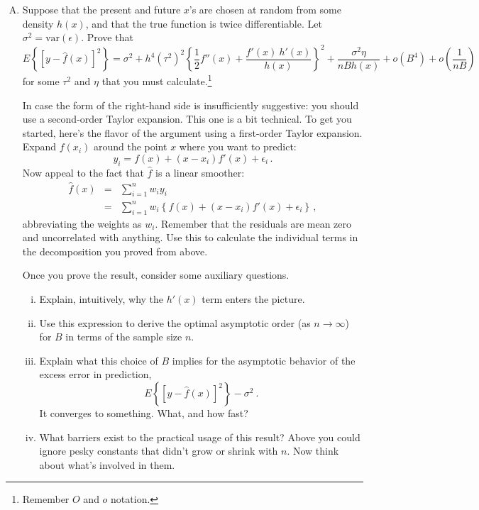 \documentclass{mynotes}
\begin{document}
\begin{enumerate}[(A)]
\item Suppose that the present and future $x$'s are chosen at random from some density $h(x)$, and that the true function is twice differentiable.  Let $\sigma^2 = \mbox{var}(\epsilon)$.  Prove that
$$
E \left\{ \left[ y - \hat{f}(x) \right]^2 \right\} = \sigma^2 
  + h^4 (\tau^2)^2 \left\{ \frac{1}{2}  f''(x) + \frac{f'(x) \ h'(x)}{ h(x) } \right\}^2 + \frac{\sigma^2 \eta}{n B h(x)} + o(B^4) + o\left( \frac{1}{nB} \right)
$$
for some $\tau^2$ and $\eta$ that you must calculate.\footnote{Remember $O$ and $o$ notation.}

In case the form of the right-hand side is insufficiently suggestive: you should use a second-order Taylor expansion.  This one is a bit technical.  To get you started, here's the flavor of the argument using a first-order Taylor expansion.  Expand $f(x_i)$ around the point $x$ where you want to predict:
$$
y_i = f(x) + (x-x_i) f'(x) + \epsilon_i \, .
$$
Now appeal to the fact that $\hat{f}$ is a linear smoother:
\begin{eqnarray*}
\hat{f}(x)  &=&  \sum_{i=1}^n w_i y_i \\
&=& \sum_{i=1}^n w_i \left\{  f(x) + (x-x_i) f'(x) + \epsilon_i \right\} \, ,
\end{eqnarray*}
abbreviating the weights as $w_i$.  Remember that the residuals are mean zero and uncorrelated with anything.  Use this to calculate the individual terms in the decomposition you proved from above.

Once you prove the result, consider some auxiliary questions.

\begin{enumerate}[i.]
\item Explain, intuitively, why the $h'(x)$ term enters the picture.
\item Use this expression to derive the optimal asymptotic order (as $n \to \infty$)  for $B$ in terms of the sample size $n$.
\item Explain what this choice of $B$ implies for the asymptotic behavior of the excess error in prediction,
$$
E \left\{ \left[ y - \hat{f}(x) \right]^2 \right\} - \sigma^2 \ .
$$
It converges to something.  What, and how fast?
\item What barriers exist to the practical usage of this result?  Above you could ignore pesky constants that didn't grow or shrink with $n$.  Now think about what's involved in them.
\end{enumerate}

\end{enumerate}
\end{document}
